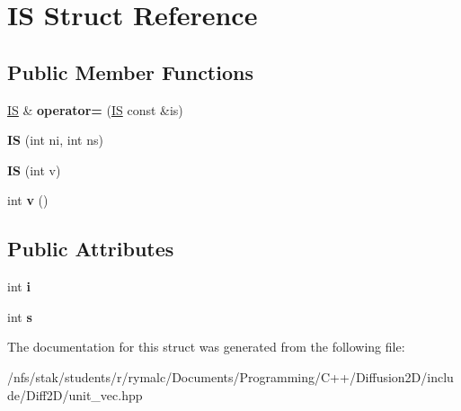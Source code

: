 \hypertarget{structIS}{\section{I\+S Struct Reference}
\label{structIS}
}
\subsection*{Public Member Functions}
\begin{DoxyCompactItemize}
\item 
\hypertarget{structIS_aec66c50fd699031a1f617117c67eda11}{\hyperlink{structIS}{I\+S} \& {\bfseries operator=} (\hyperlink{structIS}{I\+S} const \&is)}\label{structIS_aec66c50fd699031a1f617117c67eda11}

\item 
\hypertarget{structIS_a2cb6d148c70406c11b9508be2cfddd7e}{{\bfseries I\+S} (int ni, int ns)}\label{structIS_a2cb6d148c70406c11b9508be2cfddd7e}

\item 
\hypertarget{structIS_a53883df04399eab305d240898e889271}{{\bfseries I\+S} (int v)}\label{structIS_a53883df04399eab305d240898e889271}

\item 
\hypertarget{structIS_ad474289c5f0f5f5b231cd2067547cc0f}{int {\bfseries v} ()}\label{structIS_ad474289c5f0f5f5b231cd2067547cc0f}

\end{DoxyCompactItemize}
\subsection*{Public Attributes}
\begin{DoxyCompactItemize}
\item 
\hypertarget{structIS_ac0a890989ec0d04b8db157583b154c17}{int {\bfseries i}}\label{structIS_ac0a890989ec0d04b8db157583b154c17}

\item 
\hypertarget{structIS_a3a4dc37a5dc69fa81e33c5e7115dca71}{int {\bfseries s}}\label{structIS_a3a4dc37a5dc69fa81e33c5e7115dca71}

\end{DoxyCompactItemize}


The documentation for this struct was generated from the following file\+:\begin{DoxyCompactItemize}
\item 
/nfs/stak/students/r/rymalc/\+Documents/\+Programming/\+C++/\+Diffusion2\+D/include/\+Diff2\+D/unit\+\_\+vec.\+hpp\end{DoxyCompactItemize}

